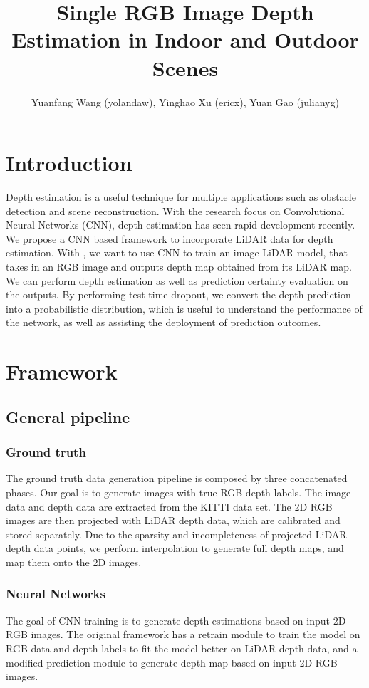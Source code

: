 \documentclass[letterpaper, 10 pt, conference]{ieeeconf}
\title{\LARGE \bf Single RGB Image Depth Estimation in Indoor and Outdoor Scenes}
\author{Yuanfang Wang (yolandaw), Yinghao Xu (ericx), Yuan Gao (julianyg)}
\begin{document}
\maketitle
\section{Introduction}
Depth estimation is a useful technique for multiple applications such as obstacle detection and scene reconstruction. With the research focus on Convolutional Neural Networks (CNN), depth estimation has seen rapid development recently. We propose a CNN based framework to incorporate LiDAR data for depth estimation. With , we want to use CNN to train an image-LiDAR model, that takes in an RGB image and outputs depth map obtained from its LiDAR map. We can perform depth estimation as well as prediction certainty evaluation on the outputs. By performing test-time dropout, we convert the depth prediction into a probabilistic distribution, which is useful to understand the performance of the network, as well as assisting the deployment of prediction outcomes.\\
\section{Framework}
\subsection{General pipeline}
\subsubsection{Ground truth}
The ground truth data generation pipeline is composed by three concatenated phases. Our goal is to generate images with true RGB-depth labels. The image data and depth data are extracted from the KITTI data set. The 2D RGB images are then projected with LiDAR depth data, which are calibrated and stored separately. Due to the sparsity and incompleteness of projected LiDAR depth data points, we perform interpolation to generate full depth maps, and map them onto the 2D images. \\

\subsubsection{Neural Networks}
The goal of CNN training is to generate depth estimations based on input 2D RGB images. The original framework has a retrain module to train the model on RGB data and depth labels to fit the model better on LiDAR depth data, and a modified prediction module to generate depth map based on input 2D RGB images.\\
\end{document}
